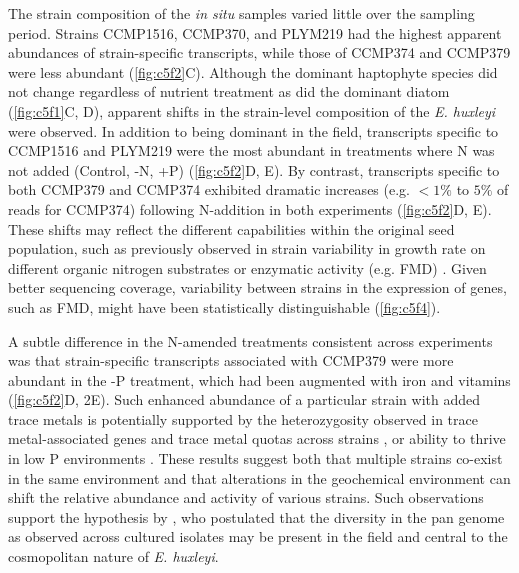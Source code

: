 The strain composition of the \textit{in situ} samples varied little over the sampling period. Strains CCMP1516, CCMP370, and PLYM219 had the highest apparent abundances of strain-specific transcripts, while those of CCMP374 and CCMP379 were less abundant (\cref{fig:c5f2}C). Although the dominant haptophyte species did not change regardless of nutrient treatment as did the dominant diatom (\cref{fig:c5f1}C, D), apparent shifts in the strain-level composition of the \textit{E. huxleyi} were observed. In addition to being dominant in the field, transcripts specific to CCMP1516 and PLYM219 were the most abundant in treatments where N was not added (Control, -N, +P) (\cref{fig:c5f2}D, E). By contrast, transcripts specific to both CCMP379 and CCMP374 exhibited dramatic increases (e.g. $<1\%$ to $5\%$ of reads for CCMP374) following N-addition in both experiments (\cref{fig:c5f2}D, E). These shifts may reflect the different capabilities within the original seed population, such as previously observed in strain variability in growth rate on different organic nitrogen substrates \citep{Strom2009} or enzymatic activity (e.g. FMD) \citep{Palenik1997, Bruhn2010}. Given better sequencing coverage, variability between strains in the expression of genes, such as FMD, might have been statistically distinguishable (\cref{fig:c5f4}).\par

A subtle difference in the N-amended treatments consistent across experiments was that strain-specific transcripts associated with CCMP379 were more abundant in the -P treatment, which had been augmented with iron and vitamins (\cref{fig:c5f2}D, 2E). Such enhanced abundance of a particular strain with added trace metals is potentially supported by the heterozygosity observed in trace metal-associated genes \citep{Read2013} and trace metal quotas across strains \citep{Sunda1992, Sunda1995}, or ability to thrive in low P environments \citep{Dyhrman2003}. These results suggest both that multiple strains co-exist in the same environment and that alterations in the geochemical environment can shift the relative abundance and activity of various strains. Such observations support the hypothesis by \citet{Read2013}, who postulated that the diversity in the pan genome as observed across cultured isolates may be present in the field and central to the cosmopolitan nature of \textit{E. huxleyi}. \par


